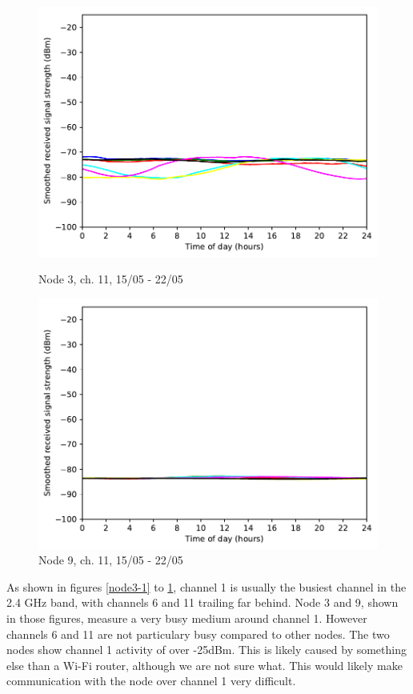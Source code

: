 \documentclass[a4paper, 11pt]{article}
\begin{document}
\begin{figure}
\begin{minipage}{0.47\textwidth}
	\includegraphics[width=\textwidth]{images/2_4_GHz/cot-node3-student_2017-05-21_chan11_image}
    \caption{Node 3, ch. 11, 15/05 - 22/05} \label{node3-11}
\end{minipage}\hfill
\begin{minipage}{0.47\textwidth}
    \centering
	\includegraphics[width=\textwidth]{images/2_4_GHz/cot-node9-student_2017-05-21_chan11_image}
    \caption{Node 9, ch. 11, 15/05 - 22/05} \label{node9-11}
\end{minipage}\hfill
\end{figure}



As shown in figures \ref{node3-1} to \ref{node9-11}, channel 1 is usually the busiest channel in the 2.4 GHz band, with channels 6 and 11 trailing far behind. Node 3 and 9, shown in those figures, measure a very busy medium around channel 1. However channels 6 and 11 are not particulary busy compared to other nodes. The two nodes show channel 1 activity of over -25dBm. This is likely caused by something else than a Wi-Fi router, although we are not sure what. This would likely make communication with the node over channel 1 very difficult.\\
\end{document}
